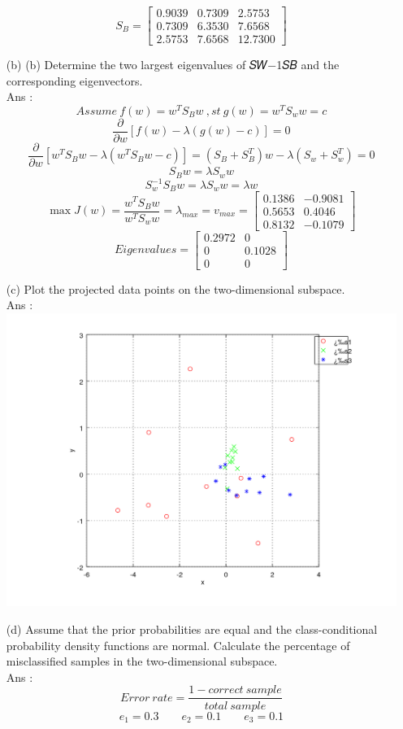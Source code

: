 \documentclass[14pt]{report}
\begin{document}
\begin{enumerate}
		\[S_{B}=\left[\begin{array}{clr}0.9039 & 0.7309 & 2.5753 \\ 0.7309 & 6.3530 & 7.6568 \\ 2.5753 & 7.6568 & 12.7300\end{array} \right] \]
		\item [(b)](b) Determine the two largest eigenvalues of 𝑆𝑊−1𝑆𝐵 and the corresponding
		eigenvectors. \\
		Ans : \\
		\[Assume\ f(w)=w^TS_Bw\ ,st\ g(w)=w^TS_ww=c \]
		\[\frac{\partial}{\partial w}[f(w)-\lambda(g(w)-c)]=0 \]
		\[\frac{\partial}{\partial w}[w^TS_Bw-\lambda(w^TS_Bw-c)]=(S_B+S_B^T)w-\lambda(S_w+S_w^T)=0 \]
		\[S_Bw=\lambda S_ww \]
		\[S_w^{-1}S_Bw=\lambda S_ww=\lambda w \]
		\[\max J(w)=\frac{w^TS_Bw}{w^TS_ww}=\lambda_{max}=v_{max}=\left[\begin{array}{clr}0.1386 & -0.9081 \\ 0.5653 & 0.4046 \\0.8132 & -0.1079\end{array} \right] \]
		\[Eigenvalues=\left[\begin{array}{clr}0.2972 & 0 \\ 0 & 0.1028 \\ 0 & 0\end{array} \right] \]
		\item [(c)]Plot the projected data points on the two-dimensional subspace.\\
		Ans :\\
		\includegraphics[width=0.5\textheight]{Question4.png}
		
		\item [(d)]Assume that the prior probabilities are equal and the class-conditional
		probability density functions are normal. Calculate the percentage of
		misclassified samples in the two-dimensional subspace. \\
		Ans : \\
		\[Error\ rate=\frac{1-correct\ sample}{total\ sample} \]
		\[e_1=0.3\qquad e_2=0.1\qquad e_3=0.1 \]
	\end{enumerate}


	
	
\end{document}
